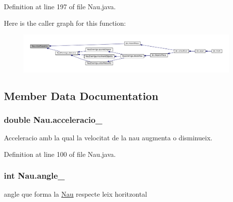Definition at line 197 of file Nau.\+java.



Here is the caller graph for this function\+:\nopagebreak
\begin{figure}[H]
\begin{center}
\leavevmode
\includegraphics[width=350pt]{class_nau_ae4f82160603f5b5c2108c34adcd781ab_icgraph}
\end{center}
\end{figure}




\subsection{Member Data Documentation}
\hypertarget{class_nau_a03ae6d8631e7668bb556e93e83dbcffd}{}
\subsubsection[{acceleracio\+\_\+}]{\setlength{\rightskip}{0pt plus 5cm}double Nau.\+acceleracio\+\_\+\hspace{0.3cm}{\ttfamily [private]}}\label{class_nau_a03ae6d8631e7668bb556e93e83dbcffd}


Acceleracio amb la qual la velocitat de la nau augmenta o disminueix. 



Definition at line 100 of file Nau.\+java.

\hypertarget{class_nau_a7bdee12f00bd2087872ff3018144799e}{}
\subsubsection[{angle\+\_\+}]{\setlength{\rightskip}{0pt plus 5cm}int Nau.\+angle\+\_\+\hspace{0.3cm}{\ttfamily [protected]}}\label{class_nau_a7bdee12f00bd2087872ff3018144799e}


angle que forma la \hyperlink{class_nau}{Nau} respecte l\textquotesingle{}eix horitzontal 



